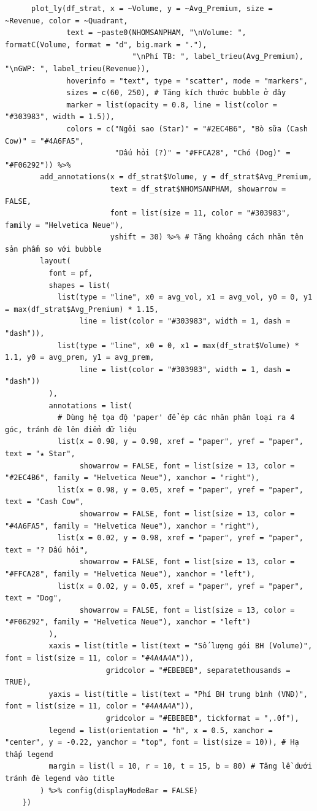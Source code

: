 \documentclass[12pt, a4paper]{article}
\begin{document}
\begin{lstlisting}
      plot_ly(df_strat, x = ~Volume, y = ~Avg_Premium, size = ~Revenue, color = ~Quadrant,
              text = ~paste0(NHOMSANPHAM, "\nVolume: ", formatC(Volume, format = "d", big.mark = "."),
                             "\nPhí TB: ", label_trieu(Avg_Premium), "\nGWP: ", label_trieu(Revenue)),
              hoverinfo = "text", type = "scatter", mode = "markers",
              sizes = c(60, 250), # Tăng kích thước bubble ở đây
              marker = list(opacity = 0.8, line = list(color = "#303983", width = 1.5)),
              colors = c("Ngôi sao (Star)" = "#2EC4B6", "Bò sữa (Cash Cow)" = "#4A6FA5",
                         "Dấu hỏi (?)" = "#FFCA28", "Chó (Dog)" = "#F06292")) %>%
        add_annotations(x = df_strat$Volume, y = df_strat$Avg_Premium,
                        text = df_strat$NHOMSANPHAM, showarrow = FALSE,
                        font = list(size = 11, color = "#303983", family = "Helvetica Neue"),
                        yshift = 30) %>% # Tăng khoảng cách nhãn tên sản phẩm so với bubble
        layout(
          font = pf,
          shapes = list(
            list(type = "line", x0 = avg_vol, x1 = avg_vol, y0 = 0, y1 = max(df_strat$Avg_Premium) * 1.15,
                 line = list(color = "#303983", width = 1, dash = "dash")),
            list(type = "line", x0 = 0, x1 = max(df_strat$Volume) * 1.1, y0 = avg_prem, y1 = avg_prem,
                 line = list(color = "#303983", width = 1, dash = "dash"))
          ),
          annotations = list(
            # Dùng hệ tọa độ 'paper' để ép các nhãn phân loại ra 4 góc, tránh đè lên điểm dữ liệu
            list(x = 0.98, y = 0.98, xref = "paper", yref = "paper", text = "★ Star",
                 showarrow = FALSE, font = list(size = 13, color = "#2EC4B6", family = "Helvetica Neue"), xanchor = "right"),
            list(x = 0.98, y = 0.05, xref = "paper", yref = "paper", text = "Cash Cow",
                 showarrow = FALSE, font = list(size = 13, color = "#4A6FA5", family = "Helvetica Neue"), xanchor = "right"),
            list(x = 0.02, y = 0.98, xref = "paper", yref = "paper", text = "? Dấu hỏi",
                 showarrow = FALSE, font = list(size = 13, color = "#FFCA28", family = "Helvetica Neue"), xanchor = "left"),
            list(x = 0.02, y = 0.05, xref = "paper", yref = "paper", text = "Dog",
                 showarrow = FALSE, font = list(size = 13, color = "#F06292", family = "Helvetica Neue"), xanchor = "left")
          ),
          xaxis = list(title = list(text = "Số lượng gói BH (Volume)", font = list(size = 11, color = "#4A4A4A")),
                       gridcolor = "#EBEBEB", separatethousands = TRUE),
          yaxis = list(title = list(text = "Phí BH trung bình (VNĐ)", font = list(size = 11, color = "#4A4A4A")),
                       gridcolor = "#EBEBEB", tickformat = ",.0f"),
          legend = list(orientation = "h", x = 0.5, xanchor = "center", y = -0.22, yanchor = "top", font = list(size = 10)), # Hạ thấp legend
          margin = list(l = 10, r = 10, t = 15, b = 80) # Tăng lề dưới tránh đè legend vào title
        ) %>% config(displayModeBar = FALSE)
    })


\end{lstlisting}
\end{document}
